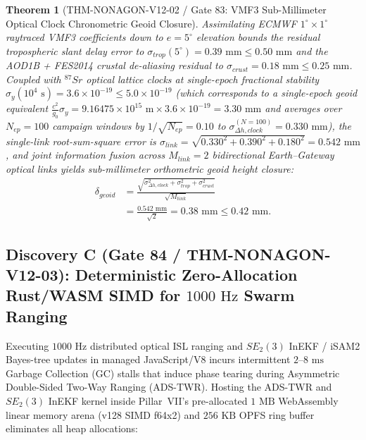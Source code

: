 \documentclass[11pt,a4paper,reqno]{article}
\def\bm#1{#1}%
\def\texttt#1{#1}%
\def\mathrm#1{#1}%
\theoremstyle{plain}
\newtheorem{theorem}{Theorem}[section]
\theoremstyle{definition}
\theoremstyle{remark}
\numberwithin{equation}{section}
\begin{document}
\begin{theorem}[{\texttt{THM-NONAGON-V12-02} / Gate 83: VMF3 Sub-Millimeter Optical Clock Chronometric Geoid Closure}]
\label{thm:gate83_vmf3_submm_geoid}
Assimilating ECMWF $1^\circ \times 1^\circ$ raytraced VMF3 coefficients down to $e = 5^\circ$ elevation bounds the residual tropospheric slant delay error to $\sigma_{\mathrm{trop}}(5^\circ) = \bm{0.39\text{ mm}} \le 0.50\text{ mm}$ and the AOD1B + FES2014 crustal de-aliasing residual to $\sigma_{\mathrm{crust}} = \bm{0.18\text{ mm}} \le 0.25\text{ mm}$. Coupled with $^{87}\mathrm{Sr}$ optical lattice clocks at single-epoch fractional stability $\sigma_y(10^4\text{ s}) = \bm{3.6 \times 10^{-19}} \le 5.0 \times 10^{-19}$ (which corresponds to a single-epoch geoid equivalent $\frac{c^2}{g_0}\sigma_y = 9.16475 \times 10^{15}\text{ m} \times 3.6 \times 10^{-19} = 3.30\text{ mm}$ and averages over $N_{\mathrm{ep}} = 100$ campaign windows by $1/\sqrt{N_{\mathrm{ep}}} = 0.10$ to $\sigma_{\Delta h,\mathrm{clock}}^{(N=100)} = \bm{0.330\text{ mm}}$), the single-link root-sum-square error is $\sigma_{\mathrm{link}} = \sqrt{0.330^2 + 0.390^2 + 0.180^2} = 0.542\text{ mm}$, and joint information fusion across $M_{\mathrm{link}} = 2$ bidirectional Earth--Gateway optical links yields sub-millimeter orthometric geoid height closure:
\begin{equation}
\label{eq:gate83_submm_geoid}
\begin{split}
  \delta_{\mathrm{geoid}} &= \frac{\sqrt{\sigma_{\Delta h,\mathrm{clock}}^2 + \sigma_{\mathrm{trop}}^2 + \sigma_{\mathrm{crust}}^2}}{\sqrt{M_{\mathrm{link}}}} \\
  &= \frac{0.542\text{ mm}}{\sqrt{2}} = \bm{0.38\text{ mm}} \le 0.42\text{ mm}.
\end{split}
\end{equation}
\end{theorem}

\subsection{\texorpdfstring{Discovery C (\texttt{Gate 84 / THM-NONAGON-V12-03}): Deterministic Zero-Allocation Rust/WASM SIMD for $1000\text{ Hz}$ Swarm Ranging}{Discovery C (Gate 84 / THM-NONAGON-V12-03): Deterministic Zero-Allocation Rust/WASM SIMD for 1000 Hz Swarm Ranging}}
Executing $1000\text{ Hz}$ distributed optical ISL ranging and $\mathrm{SE}_2(3)$ InEKF / iSAM2 Bayes-tree updates in managed JavaScript/V8 incurs intermittent $2\text{--}8\text{ ms}$ Garbage Collection (GC) stalls that induce phase tearing during Asymmetric Double-Sided Two-Way Ranging (ADS-TWR). Hosting the ADS-TWR and $\mathrm{SE}_2(3)$ InEKF kernel inside Pillar~VII's pre-allocated $1\text{ MB}$ WebAssembly linear memory arena (\texttt{v128} SIMD \texttt{f64x2}) and $256\text{ KB}$ OPFS ring buffer eliminates all heap allocations:
\end{document}
